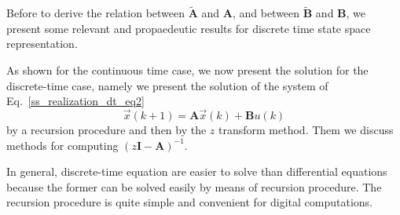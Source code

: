 \documentclass[12pt,a4paper,oneside]{book}
\begin{document}
\begin{onehalfspace}
Before to derive the relation between $\tilde{\mathbf{A}}$ and $\mathbf{A}$, 
and between $\tilde{\mathbf{B}}$ and $\mathbf{B}$, we present some relevant and 
propaedeutic results for discrete time state space representation.

As shown for the continuous time case, we now present the solution for the 
discrete-time case, namely we present the solution of the system of 
Eq.~\eqref{ss_realization_dt_eq2}
\begin{equation}\label{ss_realization_dt_eq3}
	\vec{x}(k+1) = \mathbf{A}\vec{x}(k) + \mathbf{B}u(k)
\end{equation}
by a recursion procedure and then by the $z$ transform method. Them we discuss 
methods for computing $(z\mathbf{I}-\mathbf{A})^{-1}$.

In general, discrete-time equation are easier to solve than differential 
equations because the former can be solved easily by means of recursion 
procedure. The recursion procedure is quite simple and convenient for digital 
computations.


\end{onehalfspace}
\end{document}
